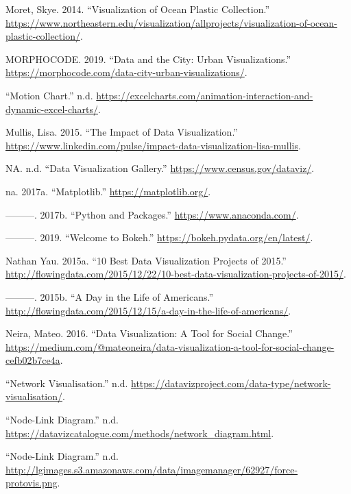 \documentclass[]{book}
\begin{document}
\leavevmode\hypertarget{ref-ocean_plastic_pollution}{}%
Moret, Skye. 2014. ``Visualization of Ocean Plastic Collection.'' \url{https://www.northeastern.edu/visualization/allprojects/visualization-of-ocean-plastic-collection/}.

\leavevmode\hypertarget{ref-MORPHOCODE}{}%
MORPHOCODE. 2019. ``Data and the City: Urban Visualizations.'' \url{https://morphocode.com/data-city-urban-visualizations/}.

\leavevmode\hypertarget{ref-motion_chart}{}%
``Motion Chart.'' n.d. \url{https://excelcharts.com/animation-interaction-and-dynamic-excel-charts/}.

\leavevmode\hypertarget{ref-image_good}{}%
Mullis, Lisa. 2015. ``The Impact of Data Visualization.'' \url{https://www.linkedin.com/pulse/impact-data-visualization-lisa-mullis}.

\leavevmode\hypertarget{ref-data_viz_gallery}{}%
NA. n.d. ``Data Visualization Gallery.'' \url{https://www.census.gov/dataviz/}.

\leavevmode\hypertarget{ref-Matplot}{}%
na. 2017a. ``Matplotlib.'' \url{https://matplotlib.org/}.

\leavevmode\hypertarget{ref-Python2019}{}%
---------. 2017b. ``Python and Packages.'' \url{https://www.anaconda.com/}.

\leavevmode\hypertarget{ref-Bokeh}{}%
---------. 2019. ``Welcome to Bokeh.'' \url{https://bokeh.pydata.org/en/latest/}.

\leavevmode\hypertarget{ref-10_best}{}%
Nathan Yau. 2015a. ``10 Best Data Visualization Projects of 2015.'' \url{http://flowingdata.com/2015/12/22/10-best-data-visualization-projects-of-2015/}.

\leavevmode\hypertarget{ref-American_life}{}%
---------. 2015b. ``A Day in the Life of Americans.'' \url{http://flowingdata.com/2015/12/15/a-day-in-the-life-of-americans/}.

\leavevmode\hypertarget{ref-Socialchange}{}%
Neira, Mateo. 2016. ``Data Visualization: A Tool for Social Change.'' \url{https://medium.com/@mateoneira/data-visualization-a-tool-for-social-change-cefb02b7ce4a}.

\leavevmode\hypertarget{ref-networks}{}%
``Network Visualisation.'' n.d. \url{https://datavizproject.com/data-type/network-visualisation/}.

\leavevmode\hypertarget{ref-node-link}{}%
``Node-Link Diagram.'' n.d. \url{https://datavizcatalogue.com/methods/network_diagram.html}.

\leavevmode\hypertarget{ref-node-link-diag}{}%
``Node-Link Diagram.'' n.d. \url{http://lgimages.s3.amazonaws.com/data/imagemanager/62927/force-protovis.png}.
\end{document}
